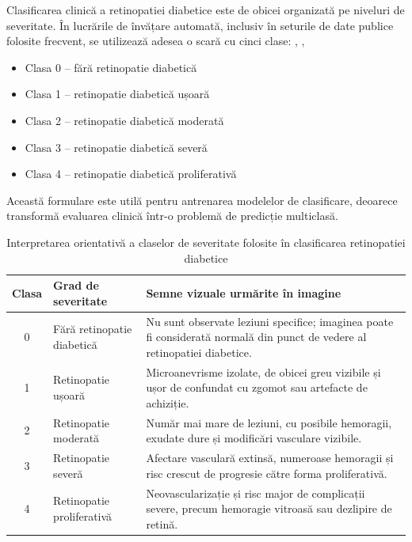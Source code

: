 \documentclass[12pt, a4paper, twoside, romanian]{teza-upb}
\begin{document}
Clasificarea clinică a retinopatiei diabetice este de obicei organizată pe niveluri de
severitate. În lucrările de învățare automată, inclusiv în seturile de date publice
folosite frecvent, se utilizează adesea o scară cu cinci clase: \cite{3_gulshan2016development}, \cite{6_wang2021deep}, \cite{14_liu2022deepdrid} 
\begin{itemize}
  \item Clasa 0 -- fără retinopatie diabetică
  \item Clasa 1 -- retinopatie diabetică ușoară
  \item Clasa 2 -- retinopatie diabetică moderată
  \item Clasa 3 -- retinopatie diabetică severă 
  \item Clasa 4 -- retinopatie diabetică proliferativă
\end{itemize}

Această formulare este utilă pentru antrenarea modelelor de clasificare, deoarece transformă evaluarea clinică într-o problemă de
predicție multiclasă.
\bigskip

\begin{table}[H]
\centering
\caption{Interpretarea orientativă a claselor de severitate folosite în clasificarea retinopatiei diabetice}
\label{tab:stadii-dr}
\begin{tabular}{|c|p{4cm}|p{7cm}|}
\hline
\textbf{Clasa} & \textbf{Grad de severitate} & \textbf{Semne vizuale urmărite în imagine} \\
\hline
0 & Fără retinopatie diabetică & Nu sunt observate leziuni specifice; imaginea poate fi considerată normală din punct de vedere al retinopatiei diabetice. \\
\hline
1 & Retinopatie ușoară & Microanevrisme izolate, de obicei greu vizibile și ușor de confundat cu zgomot sau artefacte de achiziție. \\
\hline
2 & Retinopatie moderată & Număr mai mare de leziuni, cu posibile hemoragii, exudate dure și modificări vasculare vizibile. \\
\hline
3 & Retinopatie severă & Afectare vasculară extinsă, numeroase hemoragii și risc crescut de progresie către forma proliferativă. \\
\hline
4 & Retinopatie proliferativă & Neovascularizație și risc major de complicații severe, precum hemoragie vitroasă sau dezlipire de retină. \\
\hline
\end{tabular}
\end{table}
\end{document}
